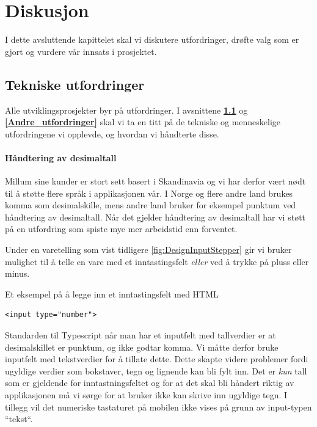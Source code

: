 \chapter{\color{Millum}\textbf{Diskusjon}}
I dette avsluttende kapittelet skal vi diskutere utfordringer, drøfte valg som er gjort og vurdere vår innsats i prosjektet.

\section{\textbf{Tekniske utfordringer}} \label{Tekniske_utfordringer}

Alle utviklingsprosjekter byr på utfordringer. I avsnittene \textbf{\ref{Tekniske_utfordringer}} og \textbf{\ref{Andre_utfordringer}} skal vi ta en titt på de tekniske og menneskelige utfordringene vi opplevde, og hvordan vi håndterte disse. 

\subsubsection{\textbf{Håndtering av desimaltall}}

Millum sine kunder er stort sett basert i Skandinavia og vi har derfor vært nødt til å støtte flere språk i applikasjonen vår. I Norge og flere andre land brukes komma som desimalskille, mens andre land bruker for eksempel punktum ved håndtering av desimaltall. Når det gjelder håndtering av desimaltall har vi støtt på en utfordring som spiste mye mer arbeidstid enn forventet. 

Under en varetelling som vist tidligere \ref{fig:DesignInputStepper} gir vi bruker mulighet til å telle en vare med et inntastingsfelt \textit{eller} ved å trykke på pluss eller minus.

Et eksempel på å legge inn et inntastingsfelt med HTML
\begin{lstlisting}
<input type="number">
\end{lstlisting}

Standarden til Typescript når man har et inputfelt med tallverdier er at desimalskillet er punktum, og ikke godtar komma. Vi måtte derfor bruke inputfelt med tekstverdier for å tillate dette. Dette skapte videre problemer fordi ugyldige verdier som bokstaver, tegn og lignende kan bli fylt inn. Det er \textit{kun} tall som er gjeldende for inntastningsfeltet og for at det skal bli håndert riktig av applikasjonen må vi sørge for at bruker ikke kan skrive inn ugyldige tegn. I tillegg  vil det numeriske tastaturet på mobilen ikke vises på grunn av input-typen ``tekst``. 

